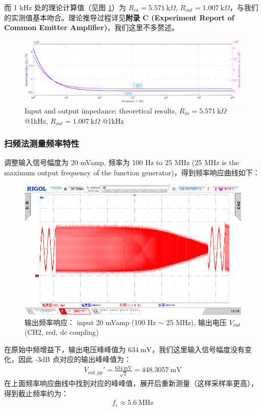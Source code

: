 \documentclass[UTF8]{article}
\begin{document}
而 1 kHz 处的理论计算值（见图 \ref{fig: Input and output impedance theoretical results}）为 $R_{in} = 5.571 \ \mathrm{k}\Omega$, $R_{out} = 1.007 \ \mathrm{k}\Omega$，与我们的实测值基本吻合。理论推导过程详见\textbf{附录 C (Experiment Report of Common Emitter Amplifier)}，我们这里不多赘述。

\begin{figure}[H]\centering
    \includegraphics[width=\columnwidth]{LCE-02-三极管/assets/输入输出阻抗理论结果.pdf}
    \caption{Input and output impedance: theoretical results, $R_{in} = 5.571 \ \mathrm{k}\Omega$ @1kHz, $R_{out} = 1.007 \ \mathrm{k}\Omega$ @1kHz} 
    \label{fig: Input and output impedance theoretical results}
\end{figure}

\subsubsection{扫频法测量频率特性}

调整输入信号幅度为 20 mVamp, 频率为 100 Hz to 25 MHz (25 MHz is the maximum output frequency of the function generator)，得到频率响应曲线如下：
\begin{figure}[H]\centering
    \includegraphics[width=\columnwidth]{LCE-02-三极管/assets/频率响应 100Hz to 25MHz.png}
    \caption{输出频率响应： input 20 mVamp (100 Hz $\sim$ 25 MHz), 输出电压 $V_{out}$ (CH2, red, dc coupling)}
\end{figure}
在原始中频增益下，输出电压峰峰值为 $634 \ \mathrm{mV}$，我们这里输入信号幅度没有变化，因此 -3dB 点对应的输出峰峰值为：
\begin{gather}
V_{out,pp}' = \frac{634 \ \mathrm{mV}}{\sqrt{2}} = 448.3057 \ \mathrm{mV} 
\end{gather}
在上面频率响应曲线中找到对应的峰峰值，展开后重新测量（这样采样率更高），得到截止频率约为：
\begin{gather}
f_c \approx 5.6 \ \mathrm{MHz}
\end{gather}
\end{document}
